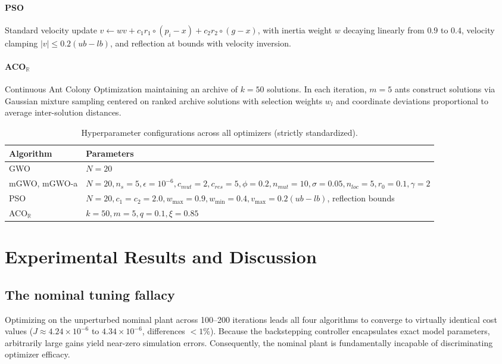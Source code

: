 \documentclass[a4paper,fleqn]{cas-dc}
\newcommand{\mgwo}{mGWO}
\newcommand{\mgwoa}{mGWO-a}
\newcommand{\acor}{ACO$_\mathbb{R}$}
\begin{document}
\paragraph{PSO \cite{kennedy1995,clerc2002}} Standard velocity update $v\leftarrow wv+c_1r_1\circ(p_i-x)+c_2r_2\circ(g-x)$, with inertia weight $w$ decaying linearly from $0.9$ to $0.4$, velocity clamping $|v|\le0.2(ub-lb)$, and reflection at bounds with velocity inversion.

\paragraph{\acor{} \cite{socha2008}} Continuous Ant Colony Optimization maintaining an archive of $k=50$ solutions. In each iteration, $m=5$ ants construct solutions via Gaussian mixture sampling centered on ranked archive solutions with selection weights $w_l$ and coordinate deviations proportional to average inter-solution distances.

\begin{table}
\caption{Hyperparameter configurations across all optimizers (strictly standardized).}
\label{tab:hyper}
\begin{tabular*}{\tblwidth}{@{}LL@{}}
\toprule
Algorithm & Parameters\\
\midrule
GWO & $N=20$\\
\mgwo{}, \mgwoa{} & $N=20, n_s=5, \epsilon=10^{-6}, c_{mut}=2, c_{res}=5, \phi=0.2, n_{mut}=10, \sigma=0.05, n_{loc}=5, r_0=0.1, \gamma=2$\\
PSO & $N=20, c_1=c_2=2.0, w_{\max}=0.9, w_{\min}=0.4, v_{\max}=0.2(ub-lb)$, reflection bounds\\
\acor{} & $k=50, m=5, q=0.1, \xi=0.85$\\
\bottomrule
\end{tabular*}
\end{table}

\section{Experimental Results and Discussion}\label{sec:results}

\subsection{The nominal tuning fallacy}
Optimizing on the unperturbed nominal plant across 100--200 iterations leads all four algorithms to converge to virtually identical cost values ($J\approx4.24\times10^{-6}$ to $4.34\times10^{-6}$, differences $<1\%$). Because the backstepping controller encapsulates exact model parameters, arbitrarily large gains yield near-zero simulation errors. Consequently, the nominal plant is fundamentally incapable of discriminating optimizer efficacy.
\end{document}
